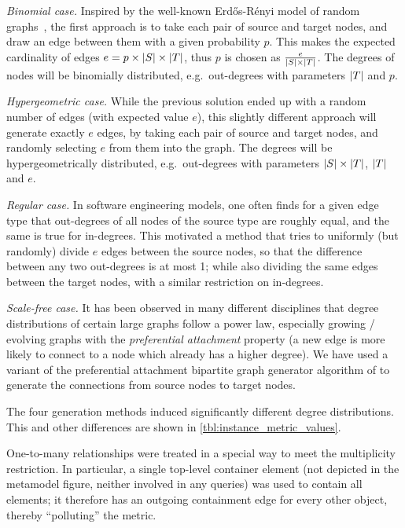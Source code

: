   \emph{Binomial case.} Inspired by the well-known Erdős-Rényi model of random
  graphs~\cite{erdos1960erg}, the first approach is to take each pair of source and
  target nodes, and draw an edge between them with a given probability $p$. This makes the
  expected cardinality of edges $e = p \times |{S}| \times |{T}|$, thus $p$
  is chosen as $\frac{e}{|{S}| \times |{T}|}$. The degrees of nodes will be
  binomially distributed, e.g.\ out-degrees with parameters $|{T}|$ and $p$.
  
  \emph{Hypergeometric case.} While the previous solution ended up with a
  random number of edges (with expected value $e$), this slightly different
  approach will generate exactly $e$ edges, by taking each pair of source and
  target nodes, and randomly selecting $e$ from them into the graph. The degrees
  will be hypergeometrically distributed, e.g.\ out-degrees with parameters
  $|{S}| \times |{T}|$, $|{T}|$ and $e$.
    
  \emph{Regular case.} In software engineering models, one often finds for a
  given edge type that out-degrees of all nodes of the source type are roughly
  equal, and the same is true for in-degrees. This motivated a method that tries
  to uniformly (but randomly) divide $e$ edges between the source nodes, so that
  the difference between any two out-degrees is at most 1; while also dividing
  the same edges between the target nodes, with a similar restriction on
  in-degrees.
  
  \emph{Scale-free case.} It has been observed in many different disciplines
  that degree distributions of certain large graphs follow a power law,
  especially growing / evolving graphs with the \emph{preferential attachment}
  property (a new edge is more likely to connect to a node which already has a
  higher degree). We have used a variant of the preferential attachment
  bipartite graph generator algorithm of \cite{RandomNetworkGeneration2005} to
  generate the connections from source nodes to target nodes.
 
The four generation methods induced significantly different degree
distributions. 
This and other differences are shown in \autoref{tbl:instance_metric_values}.
 
One-to-many relationships were treated in a special way to meet the multiplicity
restriction. In particular, a single top-level container element (not depicted
in the metamodel figure, neither involved in any queries) was used to contain
all elements; it therefore has an outgoing containment edge for every other
object, thereby ``polluting'' the  metric.


